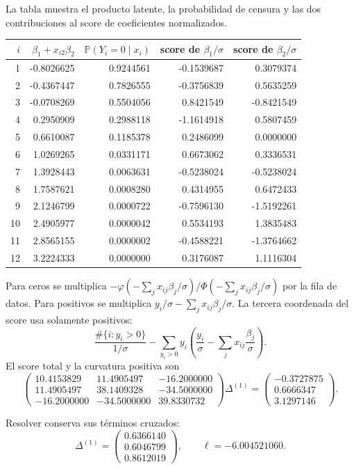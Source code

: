 \documentclass[11pt,a4paper]{article}
\newcommand{\Prob}{\mathbb P}
\begin{document}
La tabla muestra el producto latente,
la probabilidad de censura y
las dos contribuciones al score
de coeficientes normalizados.
\begin{center}\small\begin{tabular}{rrrrr}\toprule
\(i\)&\(\beta_1+x_{i2}\beta_2\)&\(\Prob(Y_i=0\mid x_i)\)&score de \(\beta_1/\sigma\)&score de \(\beta_2/\sigma\)\\\midrule
1&-0.8026625&0.9244561&-0.1539687&0.3079374\\
2&-0.4367447&0.7826555&-0.3756839&0.5635259\\
3&-0.0708269&0.5504056&0.8421549&-0.8421549\\
4&0.2950909&0.2988118&-1.1614918&0.5807459\\
5&0.6610087&0.1185378&0.2486099&0.0000000\\
6&1.0269265&0.0331171&0.6673062&0.3336531\\
7&1.3928443&0.0063631&-0.5238024&-0.5238024\\
8&1.7587621&0.0008280&0.4314955&0.6472433\\
9&2.1246799&0.0000722&-0.7596130&-1.5192261\\
10&2.4905977&0.0000042&0.5534193&1.3835483\\
11&2.8565155&0.0000002&-0.4588221&-1.3764662\\
12&3.2224333&0.0000000&0.3176087&1.1116304\\\bottomrule\end{tabular}\end{center}
Para ceros se multiplica
\(-\varphi(-\sum_jx_{ij}\beta_j/\sigma)/
\Phi(-\sum_jx_{ij}\beta_j/\sigma)\)
por la fila de datos.
Para positivos se multiplica
\(y_i/\sigma-\sum_jx_{ij}\beta_j/\sigma\).
La tercera coordenada del score
usa solamente positivos:
\[
\frac{\#\{i:y_i>0\}}{1/\sigma}
-\sum_{y_i>0}y_i\left(\frac{y_i}{\sigma}
-\sum_jx_{ij}\frac{\beta_j}{\sigma}\right).
\]
El score total y la curvatura positiva son
\[
\begin{pmatrix}10.4153829&11.4905497&-16.2000000\\11.4905497&38.1409328&-34.5000000\\-16.2000000&-34.5000000&39.8330732\end{pmatrix}\Delta^{(1)}=\begin{pmatrix}-0.3727875\\0.6666347\\3.1297146\end{pmatrix}.
\]

Resolver conserva sus términos cruzados:
\[
\Delta^{(1)}=\begin{pmatrix}0.6366140\\0.6046799\\0.8612019\end{pmatrix},\qquad\ell=-6.004521060.
\]
\end{document}

